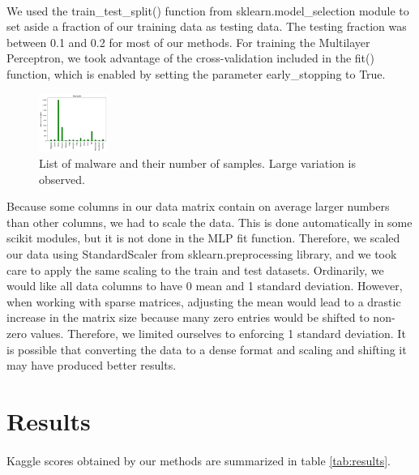 \documentclass[11pt]{article}
\begin{document}
\paragraph{} We used the train\_test\_split() function from sklearn.model\_selection module to set aside a fraction of our training data as testing data. The testing fraction was between 0.1 and 0.2 for most of our methods. For training the Multilayer Perceptron, we took advantage of the cross-validation included in the fit() function, which is enabled by setting the parameter early\_stopping to True.\\
\begin{figure}
\centering
\includegraphics[width=0.2\textwidth]{Plots/Nsample.png}
\caption{List of malware and their number of samples. Large variation is observed.}
\label{fig:var}
\end{figure}
\noindent Because some columns in our data matrix contain on average larger numbers than other columns, we had to scale the data. This is done automatically in some scikit modules, but it is not done in the MLP fit function. Therefore, we scaled our data using StandardScaler from sklearn.preprocessing library, and we took care to apply the same scaling to the train and test datasets. Ordinarily, we would like all data columns to have 0 mean and 1 standard deviation. However, when working with sparse matrices, adjusting the mean would lead to a drastic increase in the matrix size because many zero entries would be shifted to non-zero values. Therefore, we limited ourselves to enforcing 1 standard deviation. It is possible that converting the data to a dense format and scaling and shifting it may have produced better results. \\



\section{Results}
\paragraph{} Kaggle scores obtained by our methods are summarized in table \ref{tab:results}. \\
\end{document}
